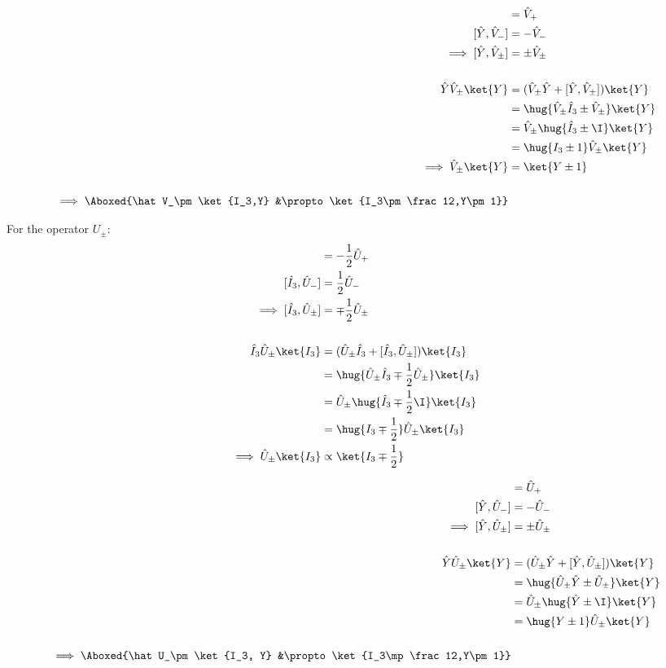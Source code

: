 \documentclass[exb,en]{exercise_5.0}
\begin{document}
\begin{align*} 
    [\hat Y, \hat V_+] &= \hat V_+ \\
    [\hat Y, \hat V_-] &= -\hat V_-\\
    \implies [\hat Y, \hat V_\pm] &= \pm \hat V_\pm\\ 
    \\
    \hat Y \hat V_\pm \ket{Y} 
    &= (\hat V_\pm\hat Y  + [\hat Y, \hat V_\pm]) \ket{Y} \\
    &= \hug{\hat V_\pm\hat I_3  \pm \hat V_\pm} \ket{Y} \\
    &= \hat V_\pm\hug{\hat I_3  \pm  \I } \ket{Y} \\
    &= \hug{I_3 \pm 1}\hat V_\pm \ket{ Y} \\
    \implies \hat V_\pm\ket{Y} &= \ket{Y\pm1}\\
    \\
    \implies \Aboxed{\hat V_\pm\ket{I_3,Y} &\propto \ket{I_3\pm\frac12,Y\pm1}}
\end{align*}

For the operator $U_\pm$:
\begin{align*}
    [\hat I_3, \hat U_+] &= -\frac12\hat U_+ \\
    [\hat I_3, \hat U_-] &= \frac12\hat U_-\\
    \implies [\hat I_3, \hat U_\pm] &= \mp \frac12\hat U_\pm\\ 
    \\
    \hat I_3 \hat U_\pm \ket{I_3} 
    &= (\hat U_\pm\hat I_3  + [\hat I_3, \hat U_\pm]) \ket{I_3} \\
    &= \hug{\hat U_\pm\hat I_3  \mp\frac12 \hat U_\pm} \ket{I_3} \\
    &= \hat U_\pm\hug{\hat I_3  \mp  \frac12 \I } \ket{I_3} \\
    &= \hug{I_3 \mp \frac12}\hat U_\pm \ket{ I_3} \\
    \implies \hat U_\pm\ket{I_3} &\propto \ket{I_3\mp\frac12}
\end{align*}

\begin{align*}
    [\hat Y, \hat U_+] &= \hat U_+ \\
    [\hat Y, \hat U_-] &= -\hat U_-\\
    \implies [\hat Y, \hat U_\pm] &= \pm\hat U_\pm\\ 
    \\
    \hat Y \hat U_\pm \ket{Y} 
    &= (\hat U_\pm\hat Y  + [\hat Y, \hat U_\pm]) \ket{Y} \\
    &= \hug{\hat U_\pm\hat Y  \pm \hat U_\pm} \ket{Y} \\
    &= \hat U_\pm\hug{\hat Y  \pm  \I } \ket{Y} \\
    &= \hug{Y \pm 1}\hat U_\pm \ket{ Y} \\
    \\
    \implies \Aboxed{\hat U_\pm\ket{I_3, Y} &\propto \ket{I_3\mp\frac12,Y\pm1}}
\end{align*}
\end{document}
